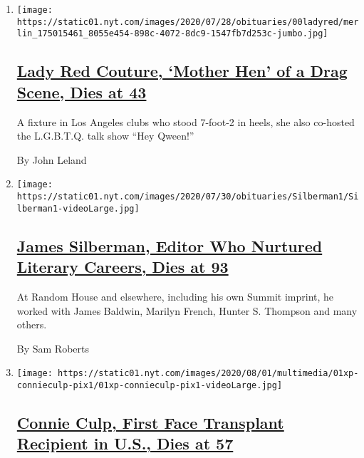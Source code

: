 \begin{enumerate}
\def\labelenumi{\arabic{enumi}.}
\item
  \texttt{[image: https://static01.nyt.com/images/2020/07/28/obituaries/00ladyred/merlin\_175015461\_8055e454-898c-4072-8dc9-1547fb7d253c-jumbo.jpg]}

  \hypertarget{lady-red-couture-mother-hen-of-a-drag-scene-dies-at-43}{%
  \subsection{\texorpdfstring{\href{/2020/08/01/arts/lady-red-couture-dead.html}{Lady
  Red Couture, `Mother Hen' of a Drag Scene, Dies at
  43}}{Lady Red Couture, `Mother Hen' of a Drag Scene, Dies at 43}}\label{lady-red-couture-mother-hen-of-a-drag-scene-dies-at-43}}

  A fixture in Los Angeles clubs who stood 7-foot-2 in heels, she also
  co-hosted the L.G.B.T.Q. talk show ``Hey Qween!''

  By John Leland
\item
  \texttt{[image: https://static01.nyt.com/images/2020/07/30/obituaries/Silberman1/Silberman1-videoLarge.jpg]}

  \hypertarget{james-silberman-editor-who-nurtured-literary-careers-dies-at-93}{%
  \subsection{\texorpdfstring{\href{/2020/08/01/books/james-silberman-dead.html}{James
  Silberman, Editor Who Nurtured Literary Careers, Dies at
  93}}{James Silberman, Editor Who Nurtured Literary Careers, Dies at 93}}\label{james-silberman-editor-who-nurtured-literary-careers-dies-at-93}}

  At Random House and elsewhere, including his own Summit imprint, he
  worked with James Baldwin, Marilyn French, Hunter S. Thompson and many
  others.

  By Sam Roberts
\item
  \texttt{[image: https://static01.nyt.com/images/2020/08/01/multimedia/01xp-connieculp-pix1/01xp-connieculp-pix1-videoLarge.jpg]}

  \hypertarget{connie-culp-first-face-transplant-recipient-in-us-dies-at-57}{%
  \subsection{\texorpdfstring{\href{/2020/08/01/us/Connie-culp-dead-face-transplant.html}{Connie
  Culp, First Face Transplant Recipient in U.S., Dies at
  57}}{Connie Culp, First Face Transplant Recipient in U.S., Dies at 57}}\label{connie-culp-first-face-transplant-recipient-in-us-dies-at-57}}


\end{enumerate}
